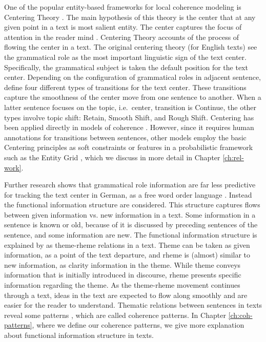 One of the popular entity-based frameworks for local coherence modeling is Centering Theory \cite{grosz95}. 
The main hypothesis of this theory is the center that at any given point in a text is most salient entity.  
The center captures the focus of attention in the reader mind \cite{grosz95}.
Centering Theory accounts of the process of flowing the center in a text. 
The original centering theory (for English texts) see the grammatical role as the most important linguistic sign of the text center. 
Specifically, the grammatical subject is taken the default position for the text center. 
Depending on the configuration of grammatical roles in adjacent sentence,  define four different types of transitions for the text center. 
These transitions capture the smoothness of the center move from one sentence to another. 
When a latter sentence focuses on the topic, i.e.\ center, transition is Continue, the other types involve topic shift: Retain, Smooth Shift, and Rough Shift. 
Centering has been applied directly in models of coherence \cite{karamanis04}.  
However, since it requires human annotations for transitions between sentences, other models employ the basic Centering principles as soft constraints or features in a probabilistic framework such as the Entity Grid , which we discuss in more detail in Chapter \ref{ch:rel-work}.

Further research shows that grammatical role information are far less predictive for tracking the text center in German, as a free word order language \cite{strube.acl96}. 
Instead the functional information structure \cite{danes74} are considered. 
This structure captures flows between given information vs. new information in a text. 
Some information in a sentence is known or old, because of it is discussed by preceding sentences of the sentence, and some information are new. 
The functional information structure is explained by  as theme-rheme relations in a text. 
Theme can be taken as given information, as a point of the text departure, and rheme is (almost) similar to new information, as clarity information in the theme. 
While theme conveys information that is initially introduced in discourse, rheme presents specific 
information regarding the theme. 
As the theme-rheme movement continues through a text, ideas in the text are expected to flow along smoothly and are easier for the reader to understand. 
Thematic relations between sentences in texts reveal some patterns \cite{danes74}, which are called  coherence patterns.
In Chapter \ref{ch:coh-patterns}, where we define our coherence patterns, we give more explanation about functional information structure \cite{danes74} in texts. 

